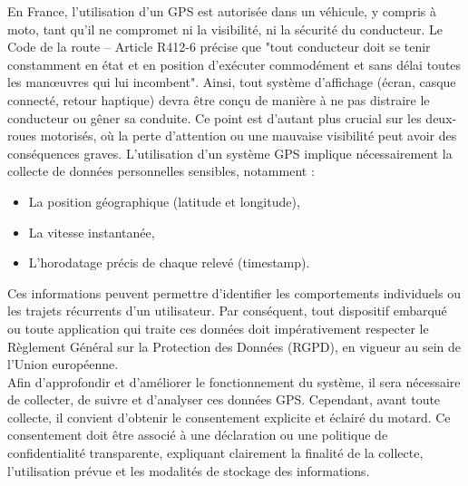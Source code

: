 \vspace{0.5cm}
En France, l'utilisation d’un GPS est autorisée dans un véhicule, y compris à moto, tant qu’il ne compromet ni la visibilité, ni la sécurité du conducteur. Le Code de la route – Article R412-6\cite{loi_code_de_la_route} précise que "tout conducteur doit se tenir constamment en état et en position d'exécuter commodément et sans délai toutes les manœuvres qui lui incombent".
Ainsi, tout système d’affichage (écran, casque connecté, retour haptique) devra être conçu de manière à ne pas distraire le conducteur ou gêner sa conduite. Ce point est d’autant plus crucial sur les deux-roues motorisés, où la perte d’attention ou une mauvaise visibilité peut avoir des conséquences graves.
\vspace{0.5cm}
L'utilisation d'un système GPS implique nécessairement la collecte de données personnelles sensibles, notamment :
\begin{itemize}
\item La position géographique (latitude et longitude),
\item La vitesse instantanée,
\item L'horodatage précis de chaque relevé (timestamp).
\end{itemize}
Ces informations peuvent permettre d'identifier les comportements individuels ou les trajets récurrents d'un utilisateur. Par conséquent, tout dispositif embarqué ou toute application qui traite ces données doit impérativement respecter le Règlement Général sur la Protection des Données (RGPD), en vigueur au sein de l'Union européenne.\\
Afin d'approfondir et d'améliorer le fonctionnement du système, il sera nécessaire de collecter, de suivre et d'analyser ces données GPS. Cependant, avant toute collecte, il convient d'obtenir le consentement explicite et éclairé du motard. Ce consentement doit être associé à une déclaration ou une politique de confidentialité transparente, expliquant clairement la finalité de la collecte, l'utilisation prévue et les modalités de stockage des informations.

